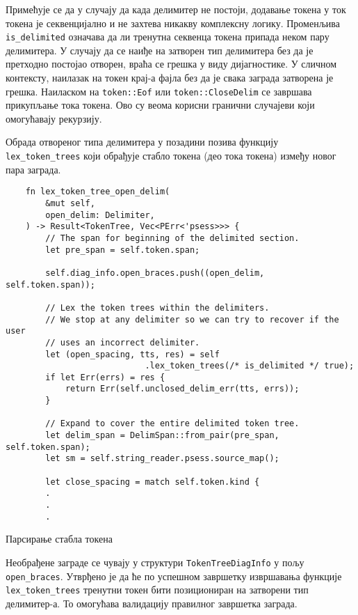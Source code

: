 Примећује се да у случају да када делимитер не постоји, додавање токена у ток токена 
је секвенцијално и не захтева никакву комплексну логику. Променљива \verb|is_delimited|
означава да ли тренутна секвенца токена припада неком пару делимитера. У случају да 
се наиђе на затворен тип делимитера без да је претходно постојао отворен, враћа се грешка
у виду дијагностике. У сличном контексту, наилазак на токен крај-а фајла без да је свака 
заграда затворена је грешка. 
Наиласком на \verb|token::Eof| или \verb|token::CloseDelim| се завршава прикупљање тока токена.
Ово су веома корисни гранични случајеви који омогућавају рекурзију. 

Обрада отвореног типа делимитера у позадини позива функцију \verb|lex_token_trees| који обрађује
стабло токена (део тока токена) између новог пара заграда.

\begin{listing}[H]
\begin{verbatim}
    fn lex_token_tree_open_delim(
        &mut self,
        open_delim: Delimiter,
    ) -> Result<TokenTree, Vec<PErr<'psess>>> {
        // The span for beginning of the delimited section.
        let pre_span = self.token.span;

        self.diag_info.open_braces.push((open_delim, self.token.span));

        // Lex the token trees within the delimiters.
        // We stop at any delimiter so we can try to recover if the user
        // uses an incorrect delimiter.
        let (open_spacing, tts, res) = self
                            .lex_token_trees(/* is_delimited */ true);
        if let Err(errs) = res {
            return Err(self.unclosed_delim_err(tts, errs));
        }

        // Expand to cover the entire delimited token tree.
        let delim_span = DelimSpan::from_pair(pre_span, self.token.span);
        let sm = self.string_reader.psess.source_map();

        let close_spacing = match self.token.kind {
        .
        .
        .
\end{verbatim}
\caption{Парсирање стабла токена}
\end{listing}

Необрађене заграде се чувају у структури \verb|TokenTreeDiagInfo| у пољу \verb|open_braces|.
Утврђено је да ће по успешном завршетку извршавања функције \verb|lex_token_trees| 
тренутни токен бити позициониран на затворени тип делимитер-а. То омогућава валидацију 
правилног завршетка заграда.